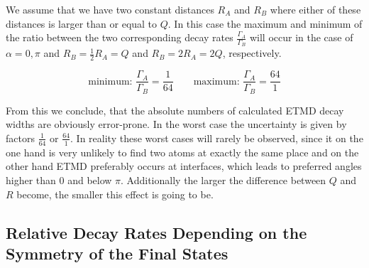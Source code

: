 We assume that we have two constant distances $R_{A}$ and $R_B$
where either of these distances is larger than or equal to $Q$.
In this case the maximum and minimum of the ratio between the two
corresponding decay rates $\frac{\Gamma_{A}}{\Gamma_B}$ will occur
in the case of $\alpha = 0,\pi$ and $R_B = \frac 12 R_{A} = Q$
and $R_B = 2 R_{A} = 2Q$, respectively.

\begin{figure}[h]
 \centering
 
 \caption{}
 \label{}
\end{figure}

\begin{equation}
\text{minimum: } \frac{\Gamma_{A}}{\Gamma_B}= \frac{1}{64} \quad\quad
\text{maximum: } \frac{\Gamma_{A}}{\Gamma_B}= \frac{64}{1}
\end{equation}

From this we conclude, that the absolute numbers of calculated ETMD
decay widths are obviously error-prone. In the worst case the uncertainty
is given by factors $\frac{1}{64}$ or $\frac{64}{1}$.
In reality these worst cases will rarely be observed, since it on
the one hand is very unlikely to find two atoms at exactly the same place
and on the other hand ETMD preferably occurs at interfaces, which leads
to preferred angles higher than 0 and below $\pi$.
Additionally the larger the difference between $Q$ and $R$ become, the
smaller this effect is going to be.


\subsection{Relative Decay Rates Depending on the Symmetry of the Final States}
